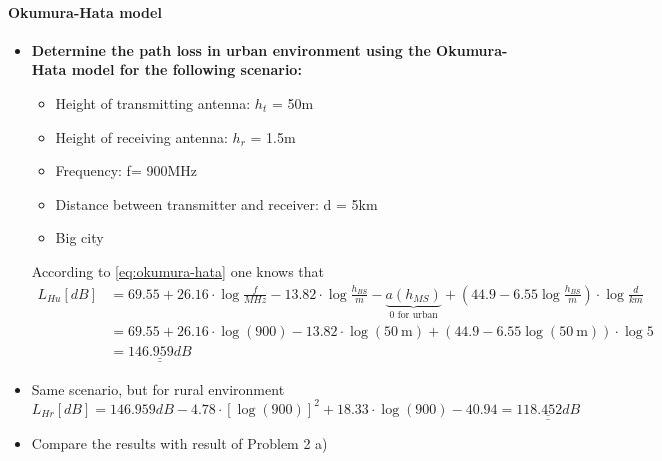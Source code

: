 \paragraph{Okumura-Hata model}
\begin{itemize}
    \item\textbf{ Determine the path loss in urban environment using the Okumura-Hata model for the following scenario:}
    \begin{itemize}
        \item Height of transmitting antenna: $h_t$ = 50m
        \item Height of receiving antenna: $h_r$ = 1.5m
        \item Frequency: f= 900MHz
        \item Distance between transmitter and receiver: d = 5km
        \item Big city
    \end{itemize}
    According to \autoref{eq:okumura-hata} one knows that 
    $$
    \begin{aligned}
    L_{H u}[d B]&=69.55+26.16 \cdot \log \frac{f}{M H z}-13.82 \cdot \log \frac{h_{B S}}{m}-\underbrace{a\left(h_{M S}\right)}_{\text{0 for urban}}+\left(44.9-6.55 \log \frac{h_{B S}}{m}\right) \cdot \log \frac{d}{k m}\\
    &=69.55+26.16 \cdot \log(900) -13.82 \cdot \log(\SI{50}{\meter})+\left(44.9-6.55 \log(\SI{50}{\meter})\right) \cdot \log 5\\&=\underline{\underline{146.959dB}}
    \end{aligned}
    $$
    \item Same scenario, but for rural environment
    $$
    L_{H r}[d B]=146.959dB -4.78 \cdot\left[ \log(900)\right]^2+18.33 \cdot \log(900)-40.94=\underline{\underline{118.452dB}}
    $$
    
    \item Compare the results with result of Problem 2 a)
\end{itemize}
